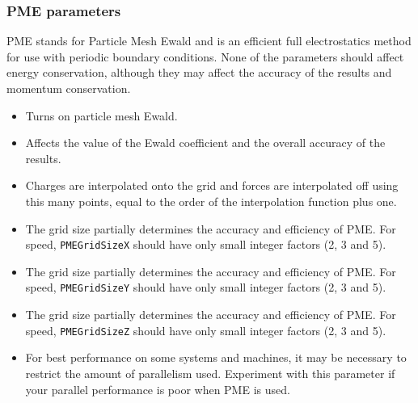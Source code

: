\subsubsection{PME parameters}

PME stands for Particle Mesh Ewald and is an efficient
full electrostatics method for use with periodic boundary conditions.
None of the parameters should affect energy conservation, although they may affect the accuracy of the results and momentum conservation.

\begin{itemize}

\item
{}
{Turns on particle mesh Ewald.}

\item
{}
{Affects the value of the Ewald coefficient and the overall accuracy of the results.}

\item
{}
{Charges are interpolated onto the grid and forces are interpolated off using this many points, equal to the order of the interpolation function plus one.}

\item
{}
{The grid size partially determines the accuracy and efficiency of PME.
For speed, {\tt PMEGridSizeX} should have only small integer factors (2, 3 and 5).}

\item
{}
{The grid size partially determines the accuracy and efficiency of PME.
For speed, {\tt PMEGridSizeY} should have only small integer factors (2, 3 and 5).}

\item
{}
{The grid size partially determines the accuracy and efficiency of PME.
For speed, {\tt PMEGridSizeZ} should have only small integer factors (2, 3 and 5).}

\item
{}
{For best performance on some systems and machines, it may be necessary to
restrict the amount of parallelism used.  Experiment with this parameter if
your parallel performance is poor when PME is used.}


\end{itemize}
